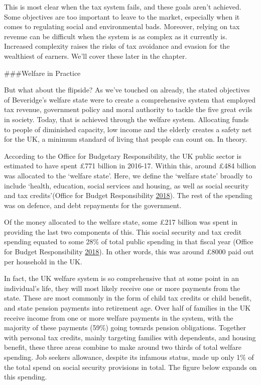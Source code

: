 \documentclass[]{article}
\begin{document}
This is most clear when the tax system fails, and these goals aren't
achieved. Some objectives are too important to leave to the market,
especially when it comes to regulating social and environmental bads.
Moreover, relying on tax revenue can be difficult when the system is as
complex as it currently is. Increased complexity raises the risks of tax
avoidance and evasion for the wealthiest of earners. We'll cover these
later in the chapter.

\#\#\#Welfare in Practice

But what about the flipside? As we've touched on already, the stated
objectives of Beveridge's welfare state were to create a comprehensive
system that employed tax revenue, government policy and moral authority
to tackle the five great evils in society. Today, that is achieved
through the welfare system. Allocating funds to people of diminished
capacity, low income and the elderly creates a safety net for the UK, a
minimum standard of living that people can count on. In theory.

According to the Office for Budgetary Responsibility, the UK public
sector is estimated to have spent £771 billion in 2016-17. Within this,
around £484 billion was allocated to the `welfare state'. Here, we
define the `welfare state' broadly to include `health, education, social
services and housing, as well as social security and tax credits'(Office
for Budget Responsibility \protect\hyperlink{ref-OBR2018}{2018}). The
rest of the spending was on defence, and debt repayments for the
government.

Of the money allocated to the welfare state, some £217 billion was spent
in providing the last two components of this. This social security and
tax credit spending equated to some 28\% of total public spending in
that fiscal year (Office for Budget Responsibility
\protect\hyperlink{ref-OBR2018}{2018}). In other words, this was around
£8000 paid out per household in the UK.

In fact, the UK welfare system is so comprehensive that at some point in
an individual's life, they will most likely receive one or more payments
from the state. These are most commonly in the form of child tax credits
or child benefit, and state pension payments into retirement age. Over
half of families in the UK receive income from one or more welfare
payments in the system, with the majority of these payments (59\%) going
towards pension obligations. Together with personal tax credits, mainly
targeting families with dependents, and housing benefit, these three
areas combine to make around two thirds of total welfare spending. Job
seekers allowance, despite its infamous status, made up only 1\% of the
total spend on social security provisions in total. The figure below
expands on this spending.
\end{document}
